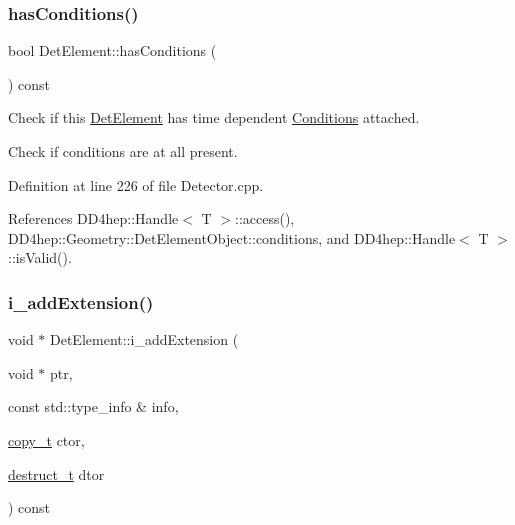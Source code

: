 \subsubsection{\texorpdfstring{has\+Conditions()}{hasConditions()}}
{\footnotesize\ttfamily bool Det\+Element\+::has\+Conditions (\begin{DoxyParamCaption}{ }\end{DoxyParamCaption}) const}



Check if this \hyperlink{class_d_d4hep_1_1_geometry_1_1_det_element}{Det\+Element} has time dependent \hyperlink{namespace_d_d4hep_1_1_conditions}{Conditions} attached. 

Check if conditions are at all present. 

Definition at line 226 of file Detector.\+cpp.



References D\+D4hep\+::\+Handle$<$ T $>$\+::access(), D\+D4hep\+::\+Geometry\+::\+Det\+Element\+Object\+::conditions, and D\+D4hep\+::\+Handle$<$ T $>$\+::is\+Valid().

\hypertarget{class_d_d4hep_1_1_geometry_1_1_det_element_ae12f8a3f2e197c8bbad5c7f32778d876}{}\label{class_d_d4hep_1_1_geometry_1_1_det_element_ae12f8a3f2e197c8bbad5c7f32778d876} 
\subsubsection{\texorpdfstring{i\+\_\+add\+Extension()}{i\_addExtension()}}
{\footnotesize\ttfamily void $\ast$ Det\+Element\+::i\+\_\+add\+Extension (\begin{DoxyParamCaption}\item[{void $\ast$}]{ptr,  }\item[{const std\+::type\+\_\+info \&}]{info,  }\item[{\hyperlink{class_d_d4hep_1_1_geometry_1_1_det_element_a5eca2ca4ab2049faab552a0ad3f616a1}{copy\+\_\+t}}]{ctor,  }\item[{\hyperlink{class_d_d4hep_1_1_geometry_1_1_det_element_a3fb2233645917aa646b957308fc750cf}{destruct\+\_\+t}}]{dtor }\end{DoxyParamCaption}) const\hspace{0.3cm}{\ttfamily [protected]}}



